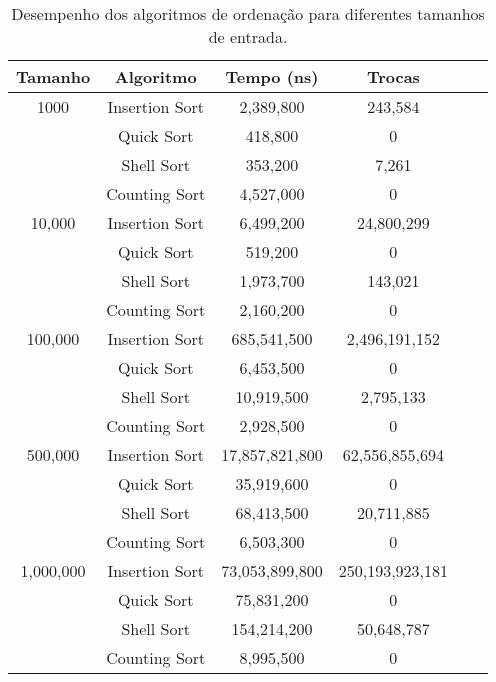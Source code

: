\documentclass{article}
\begin{document}
\begin{table}[h!]
    \centering
    \begin{tabular}{@{}cccccc@{}}
        \toprule
        Tamanho & Algoritmo        & Tempo (ns)      & Trocas        \\ \midrule
        1000    & Insertion Sort   & 2,389,800      & 243,584       \\
                & Quick Sort       & 418,800        & 0             \\
                & Shell Sort       & 353,200        & 7,261         \\
                & Counting Sort    & 4,527,000      & 0             \\ \midrule
        10,000  & Insertion Sort   & 6,499,200      & 24,800,299    \\
                & Quick Sort       & 519,200        & 0             \\
                & Shell Sort       & 1,973,700      & 143,021       \\
                & Counting Sort    & 2,160,200      & 0             \\ \midrule
        100,000 & Insertion Sort   & 685,541,500    & 2,496,191,152 \\
                & Quick Sort       & 6,453,500      & 0             \\
                & Shell Sort       & 10,919,500     & 2,795,133     \\
                & Counting Sort    & 2,928,500      & 0             \\ \midrule
        500,000 & Insertion Sort   & 17,857,821,800 & 62,556,855,694\\
                & Quick Sort       & 35,919,600     & 0             \\
                & Shell Sort       & 68,413,500     & 20,711,885    \\
                & Counting Sort    & 6,503,300      & 0             \\ \midrule
        1,000,000& Insertion Sort  & 73,053,899,800 & 250,193,923,181\\
                & Quick Sort       & 75,831,200     & 0             \\
                & Shell Sort       & 154,214,200    & 50,648,787    \\
                & Counting Sort    & 8,995,500      & 0             \\ \bottomrule
    \end{tabular}
    \caption{Desempenho dos algoritmos de ordenação para diferentes tamanhos de entrada.}
    \label{tab:performance}
\end{table}
\end{document}
